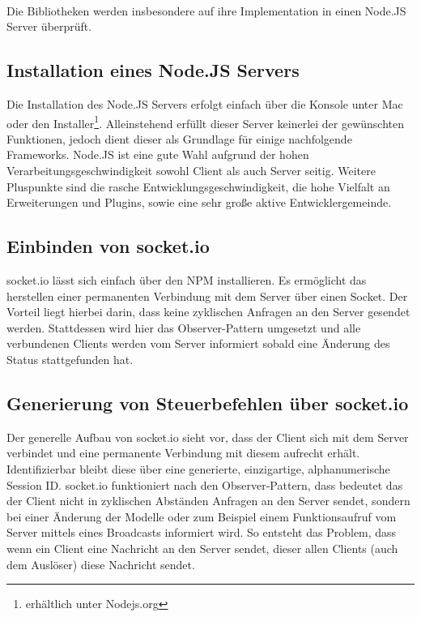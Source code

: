 \\Die Bibliotheken werden insbesondere auf ihre Implementation in einen Node.JS Server überprüft.

	\subsection{Installation eines Node.JS Servers}
	Die Installation des Node.JS Servers erfolgt einfach über die Konsole unter Mac oder den Installer\footnote{erhältlich unter Nodejs.org}. Alleinstehend erfüllt dieser Server keinerlei der gewünschten Funktionen, jedoch dient dieser als Grundlage für einige nachfolgende Frameworks. Node.JS ist eine gute Wahl aufgrund der hohen Verarbeitungsgeschwindigkeit sowohl Client als auch Server seitig. Weitere Pluspunkte sind die rasche Entwicklungsgeschwindigkeit, die hohe Vielfalt an Erweiterungen und Plugins, sowie eine sehr große aktive Entwicklergemeinde.
	\subsection{Einbinden von socket.io}
	socket.io lässt sich einfach über den NPM installieren. Es ermöglicht das herstellen einer permanenten Verbindung mit dem Server über einen Socket. Der Vorteil liegt hierbei darin, dass keine zyklischen Anfragen an den Server gesendet werden. Stattdessen wird hier das Observer-Pattern umgesetzt und alle verbundenen Clients werden vom Server informiert sobald eine Änderung des Status stattgefunden hat. 
	
	\subsection{Generierung von Steuerbefehlen über socket.io}
	Der generelle Aufbau von socket.io sieht vor, dass der Client sich mit dem Server verbindet und eine permanente Verbindung mit diesem aufrecht erhält. Identifizierbar bleibt diese über eine generierte, einzigartige, alphanumerische Session ID. socket.io funktioniert nach den Observer-Pattern, dass bedeutet das der Client nicht in zyklischen Abständen Anfragen an den Server sendet, sondern bei einer Änderung der Modelle oder zum Beispiel einem Funktionsaufruf vom Server mittels eines Broadcasts informiert wird. So entsteht das Problem, dass wenn ein Client eine Nachricht an den Server sendet, dieser allen Clients (auch dem Auslöser) diese Nachricht sendet. 
	
	
